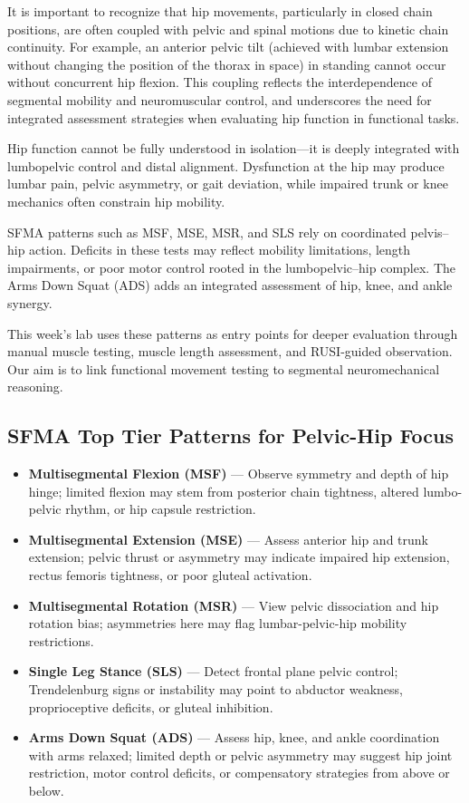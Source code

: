 It is important to recognize that hip movements, particularly in closed chain positions, are often coupled with pelvic and spinal motions due to kinetic chain continuity. For example, an anterior pelvic tilt (achieved with lumbar extension without changing the position of the thorax in space) in standing cannot occur without concurrent hip flexion. This coupling reflects the interdependence of segmental mobility and neuromuscular control, and underscores the need for integrated assessment strategies when evaluating hip function in functional tasks.

Hip function cannot be fully understood in isolation—it is deeply integrated with lumbopelvic control and distal alignment. Dysfunction at the hip may produce lumbar pain, pelvic asymmetry, or gait deviation, while impaired trunk or knee mechanics often constrain hip mobility.

\begin{tcolorbox}[colback=gray!5, colframe=black, title={Functional Movement Approach: Top Tier SFMA Patterns}]
SFMA patterns such as MSF, MSE, MSR, and SLS rely on coordinated pelvis–hip action. Deficits in these tests may reflect mobility limitations, length impairments, or poor motor control rooted in the lumbopelvic–hip complex. The Arms Down Squat (ADS) adds an integrated assessment of hip, knee, and ankle synergy.
\end{tcolorbox}

This week’s lab uses these patterns as entry points for deeper evaluation through manual muscle testing, muscle length assessment, and RUSI-guided observation. Our aim is to link functional movement testing to segmental neuromechanical reasoning.

\subsection*{SFMA Top Tier Patterns for Pelvic-Hip Focus}

\begin{itemize}
  \item \textbf{Multisegmental Flexion (MSF)} — Observe symmetry and depth of hip hinge; limited flexion may stem from posterior chain tightness, altered lumbo-pelvic rhythm, or hip capsule restriction.
  \item \textbf{Multisegmental Extension (MSE)} — Assess anterior hip and trunk extension; pelvic thrust or asymmetry may indicate impaired hip extension, rectus femoris tightness, or poor gluteal activation.
  \item \textbf{Multisegmental Rotation (MSR)} — View pelvic dissociation and hip rotation bias; asymmetries here may flag lumbar-pelvic-hip mobility restrictions.
  \item \textbf{Single Leg Stance (SLS)} — Detect frontal plane pelvic control; Trendelenburg signs or instability may point to abductor weakness, proprioceptive deficits, or gluteal inhibition.
  \item \textbf{Arms Down Squat (ADS)} — Assess hip, knee, and ankle coordination with arms relaxed; limited depth or pelvic asymmetry may suggest hip joint restriction, motor control deficits, or compensatory strategies from above or below.
\end{itemize}

